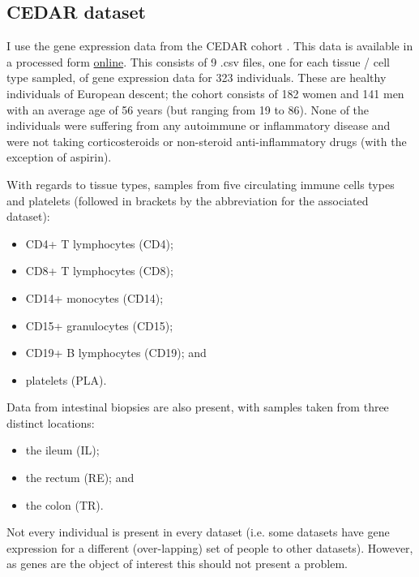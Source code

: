 \documentclass[12pt]{article} %
\begin{document}


	
	\subsection{CEDAR dataset}
	I use the gene expression data from the CEDAR cohort \citep{TheInternationalIBDGeneticsConsortiumIBDriskloci2018}. This data is available in a processed form \href{http://139.165.108.18/srv/genmol/permanent/1be6993fe41c12a051c9244d67c91da2be49e5dd26a6cd79f442bc006971e2ef/crohn-index.html}{online}. This consists of 9 .csv files, one for each tissue / cell type sampled, of gene expression data for 323 individuals. These are healthy individuals of European descent; the cohort consists of 182 women and 141 men with an average age of 56 years (but ranging from 19 to 86). None of the individuals were suffering from any autoimmune or inflammatory disease and were not taking corticosteroids or non-steroid anti-inflammatory drugs (with the exception of aspirin). 
	
	With regards to tissue types, samples from five circulating immune cells types and platelets (followed in brackets by the abbreviation for the associated dataset):
	\begin{itemize}
		\item CD4+ T lymphocytes (CD4);
		\item CD8+ T lymphocytes (CD8);
		\item CD14+ monocytes (CD14);
		\item CD15+ granulocytes (CD15);
		\item CD19+ B lymphocytes (CD19); and 
		\item platelets (PLA).
	\end{itemize}
	Data from intestinal biopsies are also present, with samples taken from three distinct locations:
	\begin{itemize}
		\item the ileum (IL);
		\item the rectum (RE); and
		\item the colon (TR).
	\end{itemize} 
	Not every individual is present in every dataset (i.e. some datasets have gene expression for a different (over-lapping) set of people to other datasets). However, as genes are the object of interest this should not present a problem.
	
\end{document}
